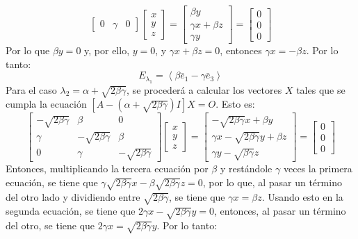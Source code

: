 \begin{solucion}
\begin{enumerate}[$a$)]
\begin{equation*}
\begin{bmatrix}
    0 & \gamma & 0
   \end{bmatrix}
   \begin{bmatrix}
    x \\ y \\ z 
   \end{bmatrix}
   = 
   \begin{bmatrix}
    \beta y \\
    \gamma x + \beta z \\
    \gamma y
   \end{bmatrix}
   =
   \begin{bmatrix}
    0 \\ 0 \\ 0
   \end{bmatrix}
  \end{equation*}
  Por lo que $\beta y = 0$ y, por ello, $y = 0$, y $\gamma x + \beta z = 0$, entonces $\gamma x = - \beta z$. Por lo tanto:
  \begin{equation*}
   E_{\lambda_1} = \left< \beta\bar{e}_1 - \gamma\bar{e}_3 \right>
  \end{equation*}
  Para el caso $\lambda_2 = \alpha+ \sqrt{2\beta\gamma}$, se proceder\'a a calcular los vectores $X$ tales que se cumpla la ecuaci\'on $\left[ A - \left(\alpha + \sqrt{2\beta\gamma}\right) I \right]X = O$. Esto es:
  \begin{equation*}
   \begin{bmatrix}
    -\sqrt{2\beta\gamma} & \beta & 0 \\
    \gamma & -\sqrt{2\beta\gamma} & \beta \\
    0 & \gamma & -\sqrt{2\beta\gamma}
   \end{bmatrix}
   \begin{bmatrix}
    x \\ y \\ z 
   \end{bmatrix}
   = 
   \begin{bmatrix}
    -\sqrt{2\beta\gamma}x + \beta y \\
    \gamma x -\sqrt{2\beta\gamma}y + \beta z \\
    \gamma y - \sqrt{\beta\gamma}z
   \end{bmatrix}
   =
   \begin{bmatrix}
    0 \\ 0 \\ 0
   \end{bmatrix}
  \end{equation*}
  Entonces, multiplicando la tercera ecuaci\'on por $\beta$ y rest\'andole $\gamma$ veces la primera ecuaci\'on, se tiene que $\gamma\sqrt{2\beta\gamma}x - \beta\sqrt{2\beta\gamma}z = 0$, por lo que, al pasar un t\'ermino del otro lado y dividiendo entre $\sqrt{2\beta\gamma}$, se tiene que $\gamma x = \beta z$. Usando esto en la segunda ecuaci\'on, se tiene que $2\gamma x - \sqrt{2\beta\gamma} y = 0$, entonces, al pasar un t\'ermino del otro, se tiene que $2\gamma x = \sqrt{2\beta\gamma} y$. Por lo tanto:

\end{enumerate}
\end{solucion}
